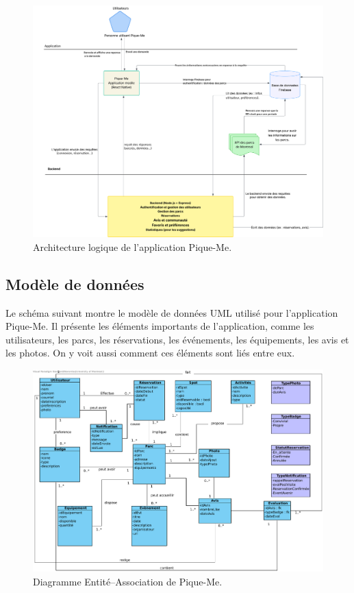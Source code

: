 \documentclass[12pt,a4paper]{article}
\begin{document}
\begin{figure}[h!]
  \centering
  \includegraphics[width=0.9\linewidth]{attachments/architecture.pdf}
  \caption{Architecture logique de l'application Pique-Me.}
\end{figure}

\subsection{Modèle de données}

Le schéma suivant montre le modèle de données UML utilisé pour l'application Pique-Me.
Il présente les éléments importants de l'application, comme les utilisateurs, les parcs, les réservations, les événements, les équipements, les avis et les photos.
On y voit aussi comment ces éléments sont liés entre eux. 

\begin{figure}[h!]
  \centering
  \includegraphics[width=0.9\linewidth]{attachments/donnee.pdf}
  \caption{Diagramme Entité–Association de Pique-Me.}
\end{figure}
\end{document}
